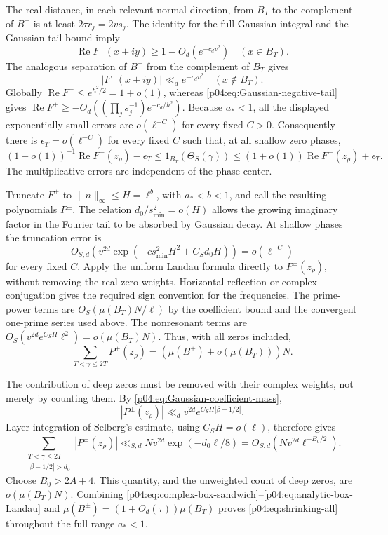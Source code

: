 \documentclass[11pt,letterpaper]{article}
\theoremstyle{definition}
\theoremstyle{remark}
\renewcommand{\Re}{\operatorname{Re}}
\newcommand{\1}{\mathbf 1}
\begin{document}
The real distance, in each relevant normal direction, from $B_T$
to the complement of $B^+$ is at least $2\tau r_j=2vs_j$.
The identity for the full Gaussian integral and the Gaussian tail
bound imply
\[
 \Re F^+(x+iy)\ge1-O_d(e^{-c_dv^2})\quad(x\in B_T).
\]
The analogous separation of $B^-$ from the complement of $B_T$
gives
\[
 |F^-(x+iy)|\ll_d e^{-c_dv^2}\quad(x\notin B_T).
\]
Globally $\Re F^-\le e^{h^2/2}=1+o(1)$, whereas
\eqref{p04:eq:Gaussian-negative-tail} gives
$\Re F^+\ge-O_d((\prod_js_j^{-1})e^{-c_d/h^2})$.
Because $a_*<1$, all the displayed exponentially small errors are
$o(\ell^{-C})$ for every fixed $C>0$. Consequently there is
$\epsilon_T=o(\ell^{-C})$ for every fixed $C$ such that, at all
shallow zero phases,
\begin{equation}\label{p04:eq:complex-box-sandwich}
 (1+o(1))^{-1}\Re F^-(z_\rho)-\epsilon_T
 \le1_{B_T}(\Theta_S(\gamma))
 \le(1+o(1))\Re F^+(z_\rho)+\epsilon_T.
\end{equation}
The multiplicative errors are independent of the phase center.

Truncate $F^\pm$ to $\|n\|_\infty\le H=\ell^b$, with
$a_*<b<1$, and call the resulting polynomials $P^\pm$.
The relation $d_0/s_{\min}^2=o(H)$ allows the growing imaginary
factor in the Fourier tail to be absorbed by Gaussian decay.
At shallow phases the truncation error is
\[
 O_{S,d}\left(v^{2d}
         \exp(-c s_{\min}^2H^2+C_Sd_0H)\right)
       =o(\ell^{-C})
\]
for every fixed $C$.  Apply the uniform Landau formula directly to
$P^\pm(z_\rho)$, without removing the real zero weights.  Horizontal
reflection or complex conjugation gives the required sign convention
for the frequencies.  The prime-power terms are
$O_S(\mu(B_T)N/\ell)$ by the coefficient bound and the convergent
one-prime series used above. The nonresonant terms are
$O_S(v^{2d}e^{C_SH}\ell^2)=o(\mu(B_T)N)$. Thus, with all zeros
included,
\begin{equation}\label{p04:eq:analytic-box-Landau}
 \sum_{T<\gamma\le2T}P^\pm(z_\rho)
       =(\mu(B^\pm)+o(\mu(B_T)))N.
\end{equation}

The contribution of deep zeros must be removed with their complex
weights, not merely by counting them. By
\eqref{p04:eq:Gaussian-coefficient-mass},
\[
 |P^\pm(z_\rho)|\ll_d v^{2d}e^{C_SH|\beta-1/2|}.
\]
Layer integration of Selberg's estimate, using $C_SH=o(\ell)$,
therefore gives
\[
 \sum_{\substack{T<\gamma\le2T\\|\beta-1/2|>d_0}}
       |P^\pm(z_\rho)|
       \ll_{S,d}Nv^{2d}\exp(-d_0\ell/8)
       =O_{S,d}(Nv^{2d}\ell^{-B_0/2}).
\]
Choose $B_0>2A+4$.  This quantity, and the unweighted count of deep
zeros, are $o(\mu(B_T)N)$.  Combining
\eqref{p04:eq:complex-box-sandwich}--\eqref{p04:eq:analytic-box-Landau} and
$\mu(B^\pm)=(1+O_d(\tau))\mu(B_T)$ proves
\eqref{p04:eq:shrinking-all} throughout the full range $a_*<1$.
\end{document}
